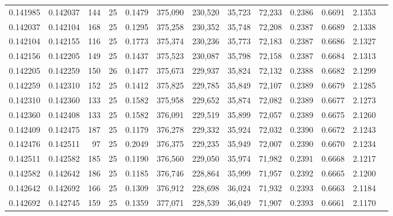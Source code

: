 \begin{tabular}{rrrrrrrrrrrrr}
0.141985 & 0.142037 &   144 &  25 &                                     0.1479 & 375,090 & 230,520 &  35,723 &  72,233 & 0.2386 & 0.6691 & 2.1353 \\
0.142037 & 0.142104 &   168 &  25 &                                     0.1295 & 375,258 & 230,352 &  35,748 &  72,208 & 0.2387 & 0.6689 & 2.1338 \\
0.142104 & 0.142155 &   116 &  25 &                                     0.1773 & 375,374 & 230,236 &  35,773 &  72,183 & 0.2387 & 0.6686 & 2.1327 \\
0.142156 & 0.142205 &   149 &  25 &                                     0.1437 & 375,523 & 230,087 &  35,798 &  72,158 & 0.2387 & 0.6684 & 2.1313 \\
0.142205 & 0.142259 &   150 &  26 &                                     0.1477 & 375,673 & 229,937 &  35,824 &  72,132 & 0.2388 & 0.6682 & 2.1299 \\
0.142259 & 0.142310 &   152 &  25 &                                     0.1412 & 375,825 & 229,785 &  35,849 &  72,107 & 0.2389 & 0.6679 & 2.1285 \\
0.142310 & 0.142360 &   133 &  25 &                                     0.1582 & 375,958 & 229,652 &  35,874 &  72,082 & 0.2389 & 0.6677 & 2.1273 \\
0.142360 & 0.142408 &   133 &  25 &                                     0.1582 & 376,091 & 229,519 &  35,899 &  72,057 & 0.2389 & 0.6675 & 2.1260 \\
0.142409 & 0.142475 &   187 &  25 &                                     0.1179 & 376,278 & 229,332 &  35,924 &  72,032 & 0.2390 & 0.6672 & 2.1243 \\
0.142476 & 0.142511 &    97 &  25 &                                     0.2049 & 376,375 & 229,235 &  35,949 &  72,007 & 0.2390 & 0.6670 & 2.1234 \\
0.142511 & 0.142582 &   185 &  25 &                                     0.1190 & 376,560 & 229,050 &  35,974 &  71,982 & 0.2391 & 0.6668 & 2.1217 \\
0.142582 & 0.142642 &   186 &  25 &                                     0.1185 & 376,746 & 228,864 &  35,999 &  71,957 & 0.2392 & 0.6665 & 2.1200 \\
0.142642 & 0.142692 &   166 &  25 &                                     0.1309 & 376,912 & 228,698 &  36,024 &  71,932 & 0.2393 & 0.6663 & 2.1184 \\
0.142692 & 0.142745 &   159 &  25 &                                     0.1359 & 377,071 & 228,539 &  36,049 &  71,907 & 0.2393 & 0.6661 & 2.1170 \\

\end{tabular}
